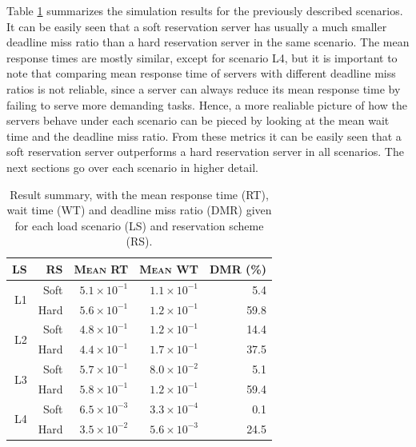 \documentclass[times, 10pt,twocolumn]{article}
\begin{document}
\label{sec:indiv-simul-results}

Table \ref{tab:summary} summarizes the simulation results for the
previously described scenarios. It can be easily seen that a soft
reservation server has usually a much smaller deadline miss ratio than
a hard reservation server in the same scenario. The mean response
times are mostly similar, except for scenario L4, but it is important
to note that comparing mean response time of servers with different
deadline miss ratios is not reliable, since a server can always reduce
its mean response time by failing to serve more demanding
tasks. Hence, a more realiable picture of how the servers behave under
each scenario can be pieced by looking at the mean wait time and the
deadline miss ratio. From these metrics it can be easily seen that a
soft reservation server outperforms a hard reservation server in all
scenarios. The next sections go over each scenario in higher detail.

\begin{table}[ht]
  \centering
  \begin{tabular}[t]{rrrrr} \hline
    \textsc{LS} & \textsc{RS} & \textsc{Mean RT} & \textsc{Mean WT} & \textsc{DMR (\%)} \\ \hline
    \multirow{2}{*}{L1} & Soft & $5.1\times 10^{-1}$   & $1.1\times 10^{-1}$   & 5.4  \\
     & Hard & $5.6\times 10^{-1}$   & $1.2\times 10^{-1}$   & 59.8 \\ \hline
    \multirow{2}{*}{L2} & Soft & $4.8\times 10^{-1}$   & $1.2\times 10^{-1}$   & 14.4 \\
     & Hard & $4.4\times 10^{-1}$   & $1.7\times 10^{-1}$   & 37.5 \\ \hline
    \multirow{2}{*}{L3} & Soft & $5.7\times 10^{-1}$   & $8.0\times 10^{-2}$   & 5.1  \\
     & Hard & $5.8\times 10^{-1}$   & $1.2\times 10^{-1}$   & 59.4 \\ \hline
    \multirow{2}{*}{L4} & Soft & $6.5\times 10^{-3}$   & $3.3\times 10^{-4}$   & 0.1  \\
     & Hard & $3.5\times 10^{-2}$   & $5.6\times 10^{-3}$   & 24.5 \\ \hline    
  \end{tabular}
  \caption{Result summary, with the mean response time (RT), wait time
  (WT) and deadline miss ratio (DMR) given for each load scenario (LS)
  and reservation scheme (RS).}
  \label{tab:summary}
\end{table}
\end{document}
